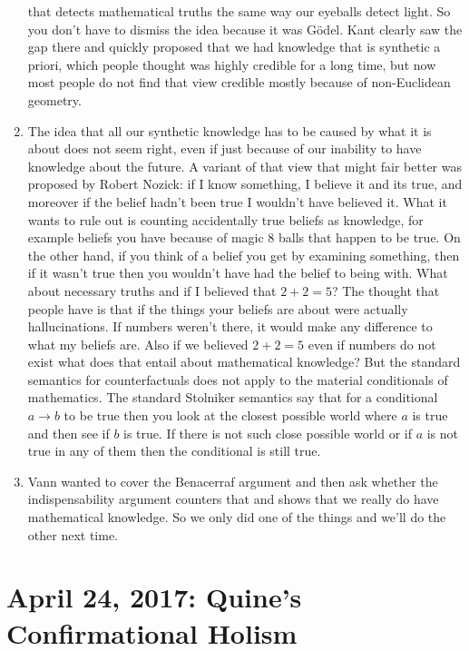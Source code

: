 \documentclass[12pt]{article}
\theoremstyle{definition}
\begin{document}
\begin{enumerate}
        that detects mathematical truths the same way our eyeballs detect
        light. So you don't have to dismiss the idea because it was G\"odel.
        Kant clearly saw the gap there and quickly proposed that we had
        knowledge that is synthetic a priori, which people thought was highly
        credible for a long time, but now most people do not find that view
        credible mostly because of non-Euclidean geometry.
    \item
        The idea that all our synthetic knowledge has to be caused by what it
        is about does not seem right, even if just because of our inability to
        have knowledge about the future. A variant of that view that might fair
        better was proposed by Robert Nozick: if I know something, I believe it
        and its true, and moreover if the belief hadn't been true I wouldn't
        have believed it. What it wants to rule out is counting accidentally
        true beliefs as knowledge, for example beliefs you have because of
        magic 8 balls that happen to be true. On the other hand, if you think
        of a belief you get by examining something, then if it wasn't true then
        you wouldn't have had the belief to being with. What about necessary
        truths and if I believed that $2 + 2 = 5$? The thought that people have
        is that if the things your beliefs are about were actually
        hallucinations. If numbers weren't there, it would make any difference
        to what my beliefs are. Also if we believed $2 + 2 = 5$ even if numbers
        do not exist what does that entail about mathematical knowledge? But
        the standard semantics for counterfactuals does not apply to the
        material conditionals of mathematics. The standard Stolniker semantics
        say that for a conditional $a \rightarrow b$ to be  true then you look
        at the closest possible world where $a$ is true and then see if $b$ is
        true. If there is not such close possible world or if $a$ is not true
        in any of them then the conditional is still true.
    \item
        Vann wanted to cover the Benacerraf argument and then ask whether the
        indispensability argument counters that and shows that we really do
        have mathematical knowledge. So we only did one of the things and we'll
        do the other next time.
\end{enumerate}

\section{April 24, 2017: Quine's Confirmational Holism}
\end{document}
